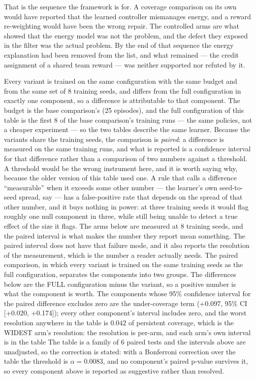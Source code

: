 That is the sequence the framework is for.  A coverage comparison on its
own would have reported that the learned controller mismanages energy, and
a reward re-weighting would have been the wrong repair.  The controlled
arms are what showed that the energy model was not the problem, and the
defect they exposed in the filter was the actual problem.  By the end of
that sequence the energy explanation had been removed from the list, and
what remained --- the credit assignment of a shared team reward --- was
neither supported nor refuted by it.


Every variant is trained on the same configuration with the same budget and
from the same set of 8 training seeds, and differs from the
full configuration in exactly one component, so a difference is
attributable to that component.  The budget is the base comparison's
(25 episodes), and the full configuration of this table is
the first 8 of the base comparison's training runs --- the same
policies, not a cheaper experiment --- so the two tables describe the same
learner.  Because the variants share the training seeds, the
comparison is \emph{paired}: a difference is measured on the same training
runs, and what is reported is a confidence interval for that difference
rather than a comparison of two numbers against a threshold.  A threshold
would be the wrong instrument here, and it is worth saying why, because
the older version of this table used one.  A rule that calls a difference
``measurable'' when it exceeds some other number --- the learner's own
seed-to-seed spread, say --- has a false-positive rate that depends on
the spread of that other number, and it buys nothing in power: at three
training seeds it would flag roughly one null component in three, while
still being unable to detect a true effect of the size it flags.  The
arms below are measured at 8 training seeds, and the paired
interval is what makes the number they report mean something.  The
paired interval does not have that failure mode, and it also reports the
resolution of the measurement, which is the number a reader actually
needs.  The paired comparison, in which every variant is trained on the same training seeds as the full configuration, separates the components into two groups.  The differences below are the FULL configuration minus the variant, so a positive number is what the component is worth.  The components whose 95\% confidence interval for the paired difference excludes zero are the under-coverage term (+0.097, 95\% CI [+0.020, +0.174]); every other component's interval includes zero, and the worst resolution anywhere in the table is $0.042$ of persistent coverage, which is the WIDEST arm's resolution: the resolution is per-arm, and each arm's own interval is in the table The table is a family of 6 paired tests and the intervals above are unadjusted, so the correction is stated: with a Bonferroni correction over the table the threshold is $\alpha = 0.0083$, and no component's paired p-value survives it, so every component above is reported as suggestive rather than resolved.

